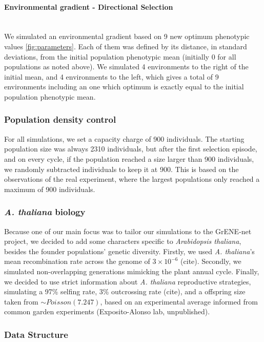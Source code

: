 \documentclass{article}
\let\oldparagraph\paragraph
\renewcommand{\paragraph}[1]{\oldparagraph{#1}\mbox{}\\}
\begin{document}
\paragraph{Environmental gradient - Directional Selection}
We simulated an environmental gradient based on 9 new optimum phenotypic values \ref{fig:parameters}. Each of them was defined by its distance, in standard deviations, from the initial population phenotypic mean (initially 0 for all populations as noted above). We simulated 4 environments to the right of the initial mean, and 4 environments to the left, which gives a total of 9 environments including an one which optimum is exactly equal to the initial population phenotypic mean. 

\subsubsection{Population density control}
For all simulations, we set a capacity charge of 900 individuals. The starting population size was always 2310 individuals, but after the first selection episode, and on every cycle, if the population reached a size larger than 900 individuals, we randomly subtracted individuals to keep it at 900. This is based on the observations of the real experiment, where the largest populations only reached a maximum of 900 individuals. 

\subsubsection{\textit{A. thaliana} biology}
Because one of our main focus was to tailor our simulations to the GrENE-net project, we decided to add some characters specific to \textit{Arabidopsis thaliana}, besides the founder populations' genetic diversity. Firstly, we used \textit{A. thaliana}'s mean recombination rate across the genome of $3 \times 10^{-6}$ (cite). Secondly, we simulated non-overlapping generations mimicking the plant annual cycle. Finally, we decided to use strict information about \textit{A. thaliana} reproductive strategies, simulating a 97\% selfing rate, 3\% outcrossing rate (cite), and a offspring size taken from $\sim Poisson(7.247)$,  based on an experimental average informed from common garden experiments (Exposito-Alonso lab, unpublished). 

\subsubsection{Data Structure}
\end{document}
